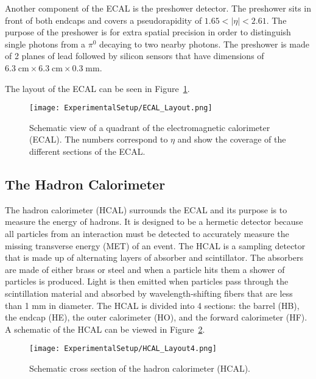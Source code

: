 Another component of the ECAL is the preshower detector. The preshower sits in front of both endcaps and covers a pseudorapidity of $1.65 < |\eta| < 2.61$. The purpose of the preshower is for extra spatial precision in order to distinguish single photons from a $\pi^{0}$ decaying to two nearby photons. The preshower is made of 2 planes of lead followed by silicon sensors that have dimensions of $6.3\;\mathrm{cm}\times6.3\;\mathrm{cm}\times0.3\;\mathrm{mm}$\cite{CMSExperiment}\cite{CMSECAL}. 

The layout of the ECAL can be seen in Figure~\ref{fig:ECALSchematic}.

\begin{figure}[htbp]
\begin{center}
\texttt{[image: ExperimentalSetup/ECAL\_Layout.png]}
\end{center}
\caption{Schematic view of a quadrant of the electromagnetic calorimeter (ECAL). The numbers correspond to $\eta$ and show the coverage of the different sections of the ECAL.}
\label{fig:ECALSchematic}
\end{figure}

\subsection{The Hadron Calorimeter}

The hadron calorimeter (HCAL) surrounds the ECAL and its purpose is to measure the energy of hadrons. It is designed to be a hermetic detector because all particles from an interaction must be detected to accurately measure the missing transverse energy (MET) of an event. The HCAL is a sampling detector that is made up of alternating layers of absorber and scintillator. The absorbers are made of either brass or steel and when a particle hits them a shower of particles is produced. Light is then emitted when particles pass through the scintillation material and absorbed by wavelength-shifting fibers that are less than 1 mm in diameter. The HCAL is divided into 4 sections: the barrel (HB), the endcap (HE), the outer calorimeter (HO), and the forward calorimeter (HF). A schematic of the HCAL can be viewed in Figure~\ref{fig:HCALSchematic}\cite{CMSExperiment}.

\begin{figure}[htbp]
\begin{center}
\texttt{[image: ExperimentalSetup/HCAL\_Layout4.png]}
\end{center}
\caption{Schematic cross section of the hadron calorimeter (HCAL).}
\label{fig:HCALSchematic}
\end{figure}

